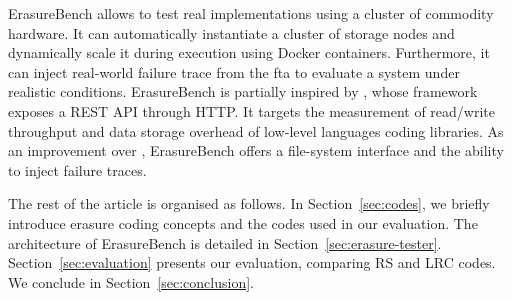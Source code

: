 ErasureBench allows to test real implementations using a cluster of commodity hardware. 
It can automatically instantiate a cluster of storage nodes and dynamically scale it during execution using Docker containers. 
Furthermore, it can inject real-world failure trace from the \ac{fta} \autocite{fta-journal} to evaluate a system under realistic conditions. 
ErasureBench is partially inspired by \autocite{Burihabwa2016}, whose framework exposes a REST API through HTTP. It targets the measurement of read/write throughput and data storage overhead of  low-level languages coding libraries. As an improvement over \autocite{Burihabwa2016}, ErasureBench offers a file-system interface and the ability to inject failure traces.






The rest of the article is organised as follows. 
In Section~\ref{sec:codes}, we briefly introduce erasure coding concepts and the codes used in our evaluation. 
The architecture of ErasureBench is detailed in Section~\ref{sec:erasure-tester}. 
Section~\ref{sec:evaluation} presents our evaluation, comparing RS and LRC codes. We conclude in Section~\ref{sec:conclusion}. 
